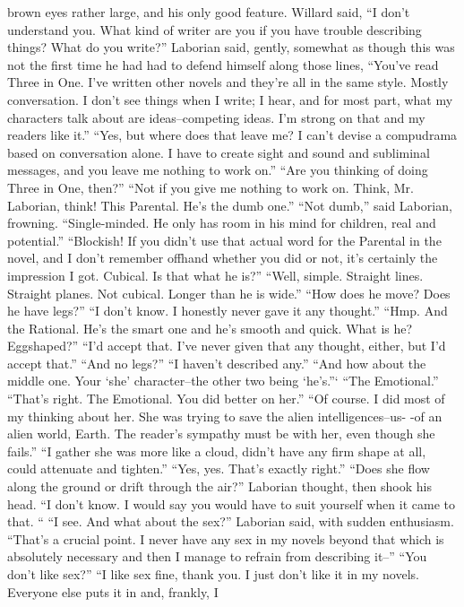 \documentclass[a4paper,12pt]{article}
\begin{document}
brown eyes rather large, and his only good feature.
Willard said, “I don’t understand you. What kind of writer are you if you have trouble describing
things? What do you write?”
Laborian said, gently, somewhat as though this was not the first time he had had to defend himself
along those lines, “You’ve read Three in One. I’ve written other novels and they’re all in the same style.
Mostly conversation. I don’t see things when I write; I hear, and for most part, what my characters talk
about are ideas--competing ideas. I’m strong on that and my readers like it.”
“Yes, but where does that leave me? I can’t devise a compudrama based on conversation alone. I
have to create sight and sound and subliminal messages, and you leave me nothing to work on.”
“Are you thinking of doing Three in One, then?”
“Not if you give me nothing to work on. Think, Mr. Laborian, think! This Parental. He’s the dumb
one.”
“Not dumb,” said Laborian, frowning. “Single-minded. He only has room in his mind for children,
real and potential.”
“Blockish! If you didn’t use that actual word for the Parental in the novel, and I don’t remember
offhand whether you did or not, it’s certainly the impression I got. Cubical. Is that what he is?”
“Well, simple. Straight lines. Straight planes. Not cubical. Longer than he is wide.”
“How does he move? Does he have legs?”
“I don’t know. I honestly never gave it any thought.”
“Hmp. And the Rational. He’s the smart one and he’s smooth and quick. What is he? Eggshaped?”
“I’d accept that. I’ve never given that any thought, either, but I’d accept that.”
“And no legs?”
“I haven’t described any.”
“And how about the middle one. Your ‘she’ character--the other two being ‘he’s.”‘
“The Emotional.”
“That’s right. The Emotional. You did better on her.”
“Of course. I did most of my thinking about her. She was trying to save the alien intelligences--us-
-of an alien world, Earth. The reader’s sympathy must be with her, even though she fails.”
“I gather she was more like a cloud, didn’t have any firm shape at all, could attenuate and tighten.”
“Yes, yes. That’s exactly right.”
“Does she flow along the ground or drift through the air?”
Laborian thought, then shook his head. “I don’t know. I would say you would have to suit yourself
when it came to that. “
“I see. And what about the sex?”
Laborian said, with sudden enthusiasm. “That’s a crucial point. I never have any sex in my novels
beyond that which is absolutely necessary and then I manage to refrain from describing it--”
“You don’t like sex?”
“I like sex fine, thank you. I just don’t like it in my novels. Everyone else puts it in and, frankly, I
\end{document}

